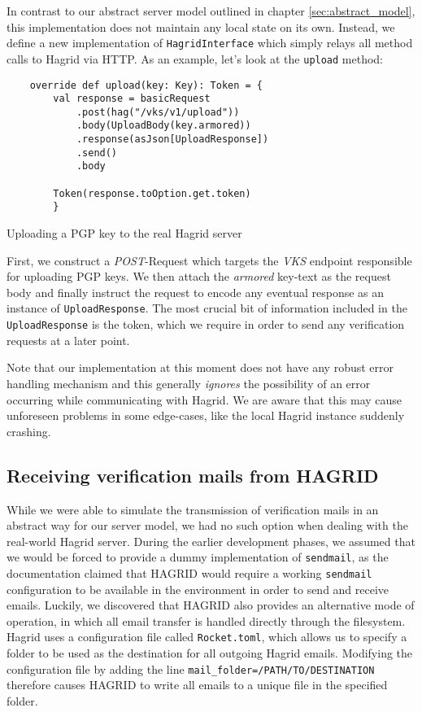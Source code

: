 In contrast to our abstract server model outlined in chapter \ref{sec:abstract_model}, this implementation does not maintain any local state on its own. Instead, we define a new implementation of \texttt{HagridInterface} which simply relays all method calls to Hagrid via HTTP. As an example, let's look at the \texttt{upload} method: 
\begin{code}
    \begin{verbatim}
    override def upload(key: Key): Token = {
        val response = basicRequest
            .post(hag("/vks/v1/upload"))
            .body(UploadBody(key.armored))
            .response(asJson[UploadResponse])
            .send()
            .body
    
        Token(response.toOption.get.token)
        }
    \end{verbatim}
    \caption{Uploading a PGP key to the real Hagrid server}
\end{code}
\label{code:hagrid_upload}
First, we construct a \emph{POST}-Request which targets the \emph{VKS} endpoint responsible for uploading PGP keys. We then attach the \emph{armored} key-text as the request body and finally instruct the request to encode any eventual response as an instance of \texttt{UploadResponse}.
The most crucial bit of information included in the \texttt{UploadResponse} is the token, which we require in order to send any verification requests at a later point.

Note that our implementation at this moment does not have any robust error handling mechanism and this generally \emph{ignores} the possibility of an error occurring while communicating with Hagrid. We are aware that this may cause unforeseen problems in some edge-cases, like the local Hagrid instance suddenly crashing.

\subsection{Receiving verification mails from HAGRID}
While we were able to simulate the transmission of verification mails in an abstract way for our server model, we had no such option when dealing with the real-world Hagrid server. During the  earlier development phases, we assumed that we would be forced to provide a dummy implementation of \texttt{sendmail}, as the documentation claimed that HAGRID would require a working \texttt{sendmail} configuration to be available in the environment in order to send and receive emails.
Luckily, we discovered that HAGRID also provides an alternative mode of operation, in which all email transfer is handled directly through the filesystem.
Hagrid uses a configuration file called \texttt{Rocket.toml}, which allows us to specify a folder to be used as the destination for all outgoing Hagrid emails.   
Modifying the configuration file by adding the line \texttt{mail_folder=/PATH/TO/DESTINATION} therefore causes HAGRID to write all emails to a unique file in the specified folder.

